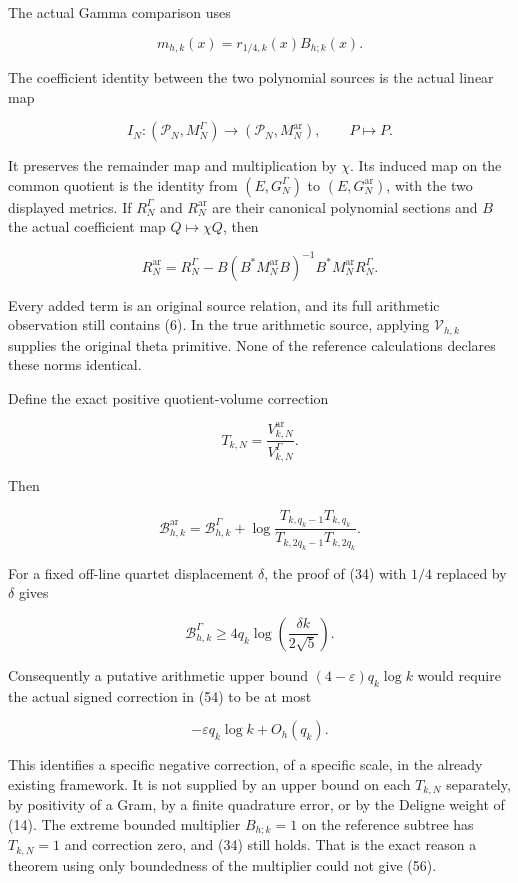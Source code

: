 \documentclass[
  11pt,
]{article}
\begin{document}
The actual Gamma comparison uses

\[
m_{h,k}(x)=r_{1/4,k}(x)B_{h;k}(x).
\tag{51}
\]

The coefficient identity between the two polynomial sources is the
actual linear map

\[
I_N:(\mathcal P_N,M_N^\Gamma)\longrightarrow(\mathcal P_N,M_N^{\mathrm{ar}}),
\qquad P\longmapsto P.
\tag{52}
\]

It preserves the remainder map and multiplication by \(\chi\). Its
induced map on the common quotient is the identity from
\((E,G_N^\Gamma)\) to \((E,G_N^{\mathrm{ar}})\), with the two displayed
metrics. If \(R_N^\Gamma\) and \(R_N^{\mathrm{ar}}\) are their canonical
polynomial sections and \(B\) the actual coefficient map
\(Q\mapsto\chi Q\), then

\[
R_N^{\mathrm{ar}}
=R_N^\Gamma-
B(B^*M_N^{\mathrm{ar}}B)^{-1}B^*M_N^{\mathrm{ar}}R_N^\Gamma.
\tag{53}
\]

Every added term is an original source relation, and its full arithmetic
observation still contains (6). In the true arithmetic source, applying
\(\mathcal V_{h,k}\) supplies the original theta primitive. None of the
reference calculations declares these norms identical.

Define the exact positive quotient-volume correction

\[
T_{k,N}=\frac{V_{k,N}^{\mathrm{ar}}}{V_{k,N}^\Gamma}.
\]

Then

\[
\boxed{\mathcal B_{h,k}^{\mathrm{ar}}
=\mathcal B_{h,k}^{\Gamma}
+\log\frac{T_{k,q_k-1}T_{k,q_k}}
{T_{k,2q_k-1}T_{k,2q_k}}.}
\tag{54}
\]

For a fixed off-line quartet displacement \(\delta\), the proof of (34)
with \(1/4\) replaced by \(\delta\) gives

\[
\mathcal B_{h,k}^{\Gamma}\ge
4q_k\log\left(\frac{\delta k}{2\sqrt5}\right).
\tag{55}
\]

Consequently a putative arithmetic upper bound
\((4-\varepsilon)q_k\log k\) would require the actual signed correction
in (54) to be at most

\[
-\varepsilon q_k\log k+O_h(q_k).
\tag{56}
\]

This identifies a specific negative correction, of a specific scale, in
the already existing framework. It is not supplied by an upper bound on
each \(T_{k,N}\) separately, by positivity of a Gram, by a finite
quadrature error, or by the Deligne weight of (14). The extreme bounded
multiplier \(B_{h;k}=1\) on the reference subtree has \(T_{k,N}=1\) and
correction zero, and (34) still holds. That is the exact reason a
theorem using only boundedness of the multiplier could not give (56).
\end{document}
